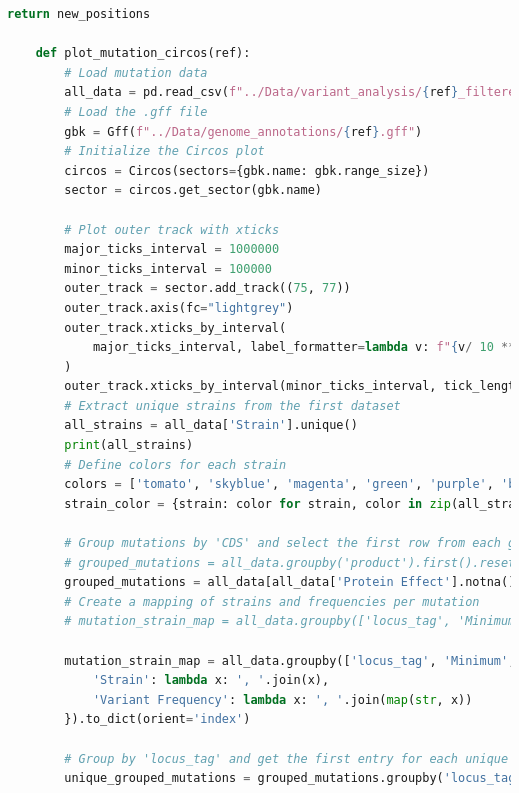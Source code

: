 \documentclass[12pt]{article}
\begin{document}
\begin{lstlisting}[language=Python]
        return new_positions

    def plot_mutation_circos(ref):
        # Load mutation data
        all_data = pd.read_csv(f"../Data/variant_analysis/{ref}_filtered_mutations.csv")
        # Load the .gff file
        gbk = Gff(f"../Data/genome_annotations/{ref}.gff")
        # Initialize the Circos plot
        circos = Circos(sectors={gbk.name: gbk.range_size})
        sector = circos.get_sector(gbk.name)

        # Plot outer track with xticks
        major_ticks_interval = 1000000
        minor_ticks_interval = 100000
        outer_track = sector.add_track((75, 77))
        outer_track.axis(fc="lightgrey")
        outer_track.xticks_by_interval(
            major_ticks_interval, label_formatter=lambda v: f"{v/ 10 ** 6:.1f} Mb"
        )
        outer_track.xticks_by_interval(minor_ticks_interval, tick_length=1, show_label=False)
        # Extract unique strains from the first dataset
        all_strains = all_data['Strain'].unique()
        print(all_strains)
        # Define colors for each strain
        colors = ['tomato', 'skyblue', 'magenta', 'green', 'purple', 'brown', 'orange', 'lightgreen', 'cadetblue']
        strain_color = {strain: color for strain, color in zip(all_strains, colors)}

        # Group mutations by 'CDS' and select the first row from each group
        # grouped_mutations = all_data.groupby('product').first().reset_index()
        grouped_mutations = all_data[all_data['Protein Effect'].notna() & all_data['Protein Effect'].ne('')].groupby(['locus_tag', 'Minimum', 'Change']).first().reset_index()
        # Create a mapping of strains and frequencies per mutation
        # mutation_strain_map = all_data.groupby(['locus_tag', 'Minimum', 'Change']).agg({'Strain': lambda x: ', '.join(x), 'Variant Frequency': lambda x: ', '.join(x)}).to_dict(orient='index')

        mutation_strain_map = all_data.groupby(['locus_tag', 'Minimum', 'Change']).agg({
            'Strain': lambda x: ', '.join(x), 
            'Variant Frequency': lambda x: ', '.join(map(str, x))
        }).to_dict(orient='index')

        # Group by 'locus_tag' and get the first entry for each unique gene
        unique_grouped_mutations = grouped_mutations.groupby('locus_tag').first()


\end{lstlisting}
\end{document}
